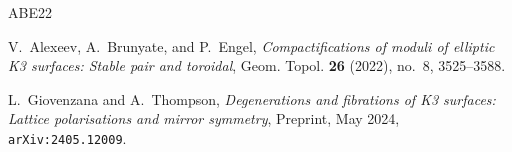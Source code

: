 \documentclass[11pt]{amsart}
\begin{document}
\begin{thebibliography}{ABE22}

V.~Alexeev, A.~Brunyate, and P.~Engel,
\emph{Compactifications of moduli of elliptic K3 surfaces: Stable pair and toroidal},
Geom. Topol. \textbf{26} (2022), no.~8, 3525--3588.

L.~Giovenzana and A.~Thompson,
\emph{Degenerations and fibrations of K3 surfaces: Lattice polarisations and mirror symmetry},
Preprint, May 2024, \texttt{arXiv:2405.12009}.

\end{thebibliography}
\end{document}
